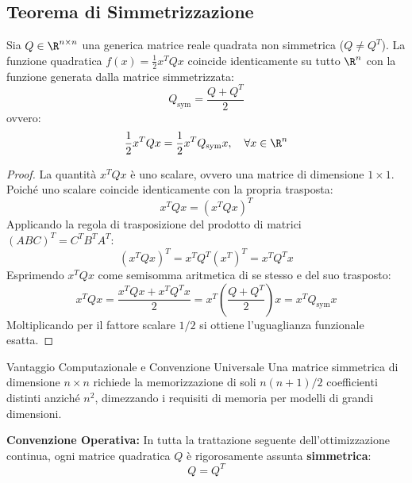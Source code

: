 \subsection{Teorema di Simmetrizzazione}
\begin{theorem}
Sia $Q \in \R^{n \times n}$ una generica matrice reale quadrata non simmetrica ($Q \neq Q^T$). La funzione quadratica $f(x) = \frac{1}{2} x^T Q x$ coincide identicamente su tutto $\R^n$ con la funzione generata dalla matrice simmetrizzata:
\begin{equation}
Q_{\text{sym}} = \frac{Q + Q^T}{2}
\end{equation}
ovvero:
\begin{equation}
\frac{1}{2} x^T Q x = \frac{1}{2} x^T Q_{\text{sym}} x, \quad \forall x \in \R^n
\end{equation}
\end{theorem}

\begin{proof}
La quantit\`a $x^T Q x$ \`e uno scalare, ovvero una matrice di dimensione $1 \times 1$. Poich\'e uno scalare coincide identicamente con la propria trasposta:
\begin{equation}
x^T Q x = (x^T Q x)^T
\end{equation}
Applicando la regola di trasposizione del prodotto di matrici $(A B C)^T = C^T B^T A^T$:
\begin{equation}
(x^T Q x)^T = x^T Q^T (x^T)^T = x^T Q^T x
\end{equation}
Esprimendo $x^T Q x$ come semisomma aritmetica di se stesso e del suo trasposto:
\begin{equation}
x^T Q x = \frac{x^T Q x + x^T Q^T x}{2} = x^T \left( \frac{Q + Q^T}{2} \right) x = x^T Q_{\text{sym}} x
\end{equation}
Moltiplicando per il fattore scalare $1/2$ si ottiene l'uguaglianza funzionale esatta.
\end{proof}

\begin{noteblock}{Vantaggio Computazionale e Convenzione Universale}
Una matrice simmetrica di dimensione $n \times n$ richiede la memorizzazione di soli $n(n+1)/2$ coefficienti distinti anzich\'e $n^2$, dimezzando i requisiti di memoria per modelli di grandi dimensioni. 

\textbf{Convenzione Operativa:} In tutta la trattazione seguente dell'ottimizzazione continua, ogni matrice quadratica $Q$ \`e rigorosamente assunta \textbf{simmetrica}:
\begin{equation}
Q = Q^T
\end{equation}
\end{noteblock}


